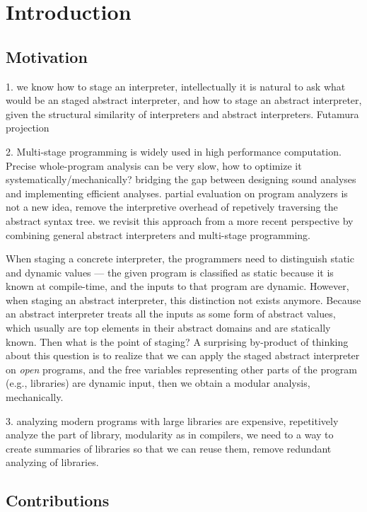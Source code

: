 \section{Introduction}

\subsection{Motivation}

1. we know how to stage an interpreter, intellectually it is natural to ask what would be an staged abstract interpreter,
and how to stage an abstract interpreter, given the structural similarity of interpreters and abstract interpreters. 
Futamura projection \cite{Futamura1999}

2. Multi-stage programming is widely used in high performance computation.
Precise whole-program analysis can be very slow, how to optimize it systematically/mechanically?
bridging the gap between designing sound analyses and implementing efficient analyses.
partial evaluation on program analyzers is not a new idea, remove the interpretive overhead of repetively 
traversing the abstract syntax tree.
we revisit this approach from a more recent perspective by combining general abstract interpreters
and multi-stage programming.

When staging a concrete interpreter, the programmers need to distinguish static and dynamic values
--- the given program is classified as static because it is known at compile-time, and the inputs to that program 
are dynamic. However, when staging an abstract interpreter, this distinction not exists anymore. 
Because an abstract interpreter treats all the inputs as some form of abstract values, which usually are 
top elements in their abstract domains and are statically known. Then what is the point of staging?
A surprising by-product of thinking about this question is to realize that we can apply the staged
abstract interpreter on \textit{open} programs, and the free variables representing other parts of 
the program (e.g., libraries) are dynamic input, then we obtain a modular analysis, mechanically.

3. analyzing modern programs with large libraries are expensive, repetitively analyze the part of library,
modularity as in compilers, we need to a way to create summaries of libraries so that we can reuse them,
remove redundant analyzing of libraries.

\subsection{Contributions}

